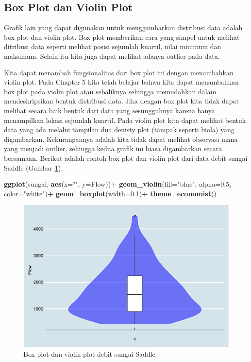 \documentclass[]{book}
\newenvironment{Shaded}{\begin{snugshade}}{\end{snugshade}}
\newcommand{\KeywordTok}[1]{\textcolor[rgb]{0.13,0.29,0.53}{\textbf{#1}}}
\newcommand{\DataTypeTok}[1]{\textcolor[rgb]{0.13,0.29,0.53}{#1}}
\newcommand{\FloatTok}[1]{\textcolor[rgb]{0.00,0.00,0.81}{#1}}
\newcommand{\StringTok}[1]{\textcolor[rgb]{0.31,0.60,0.02}{#1}}
\newcommand{\OperatorTok}[1]{\textcolor[rgb]{0.81,0.36,0.00}{\textbf{#1}}}
\newcommand{\NormalTok}[1]{#1}
\begin{document}
\subsection{Box Plot dan Violin Plot}\label{box-plot-dan-violin-plot-1}

Grafik lain yang dapat digunakan untuk menggambarkan distribusi data
adalah box plot dan violin plot. Box plot memberikan cara yang simpel
untuk melihat ditribusi data seperti melihat posisi sejumlah kuartil,
nilai minimum dan maksimum. Selain itu kita juga dapat melihat adanya
outlier pada data.

Kita dapat menambah fungsionalitas dari box plot ini dengan menambahkan
violin plot. Pada Chapter 5 kita telah belajar bahwa kita dapat
menambahkan box plot pada violin plot atau sebaliknya sehingga
memudahkan dalam mendeskripsikan bentuk distribusi data. Jika dengan box
plot kita tidak dapat melihat secara baik bentuk dari data yang
sesungguhnya karena hanya menampilkan lokasi sejumlah kuartil. Pada
violin plot kita dapat melihat bentuk data yang ada melalui tampilan dua
denisty plot (tampak seperti biola) yang digambarkan. Kekurangannya
adalah kita tidak dapat melihat observasi mana yang menjadi outlier,
sehingga kedua grafik ini biasa digambarkan secara bersamaan. Berikut
adalah contoh box plot dan violin plot dari data debit sungai Saddle
(Gambar \ref{fig:bpeda}).

\begin{Shaded}
\begin{Highlighting}[]
\KeywordTok{ggplot}\NormalTok{(sungai, }\KeywordTok{aes}\NormalTok{(}\DataTypeTok{x=}\StringTok{""}\NormalTok{, }\DataTypeTok{y=}\NormalTok{Flow))}\OperatorTok{+}
\StringTok{  }\KeywordTok{geom_violin}\NormalTok{(}\DataTypeTok{fill=}\StringTok{"blue"}\NormalTok{, }\DataTypeTok{alpha=}\FloatTok{0.5}\NormalTok{, }\DataTypeTok{color=}\StringTok{"white"}\NormalTok{)}\OperatorTok{+}
\StringTok{  }\KeywordTok{geom_boxplot}\NormalTok{(}\DataTypeTok{width=}\FloatTok{0.1}\NormalTok{)}\OperatorTok{+}
\StringTok{  }\KeywordTok{theme_economist}\NormalTok{()}
\end{Highlighting}
\end{Shaded}

\begin{figure}

{\centering \includegraphics[width=0.7\linewidth]{EnvStat_files/figure-latex/bpeda-1} 

}

\caption{Box plot dan violin plot debit sungai Saddle}\label{fig:bpeda}
\end{figure}
\end{document}
